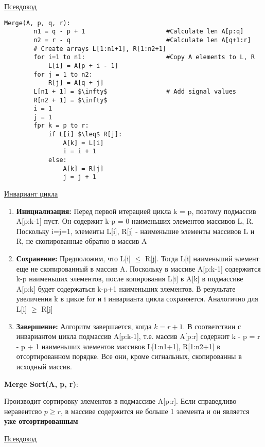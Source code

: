 \documentclass[a4paper, 12pt]{article}
\begin{document}
\underline{Псевдокод}

\begin{lstlisting}[mathescape = true]
    Merge(A, p, q, r):
        n1 = q - p + 1                      #Calculate len A[p:q]
        n2 = r - q                          #Calculate len A[q+1:r]
        # Create arrays L[1:n1+1], R[1:n2+1]
        for i=1 to n1:                      #Copy A elements to L, R
            L[i] = A[p + i - 1]
        for j = 1 to n2:
            R[j] = A[q + j]
        L[n1 + 1] = $\infty$                # Add signal values
        R[n2 + 1] = $\infty$
        i = 1
        j = 1
        fpr k = p to r:
            if L[i] $\leq$ R[j]:
                A[k] = L[i]
                i = i + 1
            else:
                A[k] = R[j]
                j = j + 1
\end{lstlisting}

\underline{Инвариант цикла}

\begin{enumerate}
    \item \textbf{Инициализация:} Перед первой итерацией цикла k = p, поэтому подмассив A[p:k-1] пуст.
    Он содержит k-p = 0 наименьших элементов массивов L, R. Поскольку i=j=1, элементы L[i], R[j] -
    наименьшие элементы массивов L и R, не скопированные обратно в массив A
    \item \textbf{Сохранение:} Предположим, что L[i] $\leq$ R[j]. Тогда L[i] наименьший элемент еще
    не скопированный в массив A. Поскольку в массиве A[p:k-1] содержится k-p наименьших элементов,
    после копирования L[i] в A[k] в подмассиве A[p:k] будет содержаться k-p+1 наименьших элементов.
    В результате увеличения k в цикле for и i инварианта цикла сохраняется. Аналогично для L[i] $\geq$ R[j]
    \item \textbf{Завершение:} Алгоритм завершается, когда $k = r + 1$. 
    В соответствии с инвариантом цикла подмассив A[p:k-1], т.е. массив A[p:r] содержит k - p = r - p + 1 наименьших элементов
    массивов L[1:n1+1], R[1:n2+1] в отсортированном порядке. Все они, кроме сигнальных, скопированны в исходный массив.
\end{enumerate}

\textbf{Merge Sort(A, p, r)}:

Производит сортировку элементов в подмассиве A[p:r]. Если справедливо неравентсво $p \geq r$,
в массиве содержится не больше 1 элемента и он является \textbf{уже отсортированным}

\underline{Псевдокод}
\end{document}

